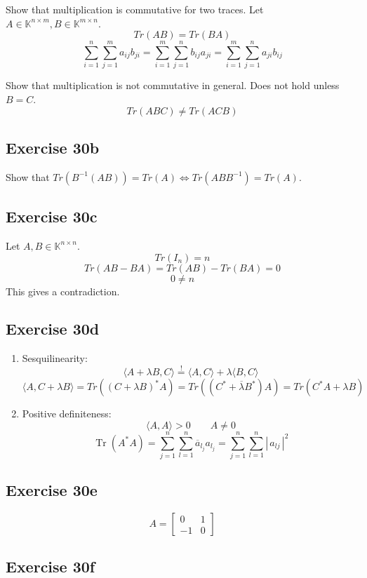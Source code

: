 \documentclass[a4paper]{article}
\theoremstyle{definition}
\DeclareMathOperator\Tr{Tr}
\newcommand\card[1]{\left|\,#1\,\right|}
\newcommand\angel[1]{\langle#1\rangle}
\begin{document}
Show that multiplication is commutative for two traces.
Let $A \in \mathbb K^{n\times m}, B \in \mathbb K^{m\times n}$.
\[ Tr(AB) = Tr(BA) \]
\[ \sum_{i=1}^n \sum_{j=1}^m a_{ij} b_{{ji}} = \sum_{i=1}^m \sum_{j=1}^n b_{ij} a_{ji} = \sum_{i=1}^m \sum_{j=1}^n a_{ji} b_{ij} \]

Show that multiplication is not commutative in general. Does not hold unless $B = C$.
\[ Tr(ABC) \neq Tr(ACB) \]

\subsection{Exercise 30b}

Show that $Tr(B^{-1}(AB)) = Tr(A) \iff Tr(ABB^{-1}) = Tr(A)$.

\subsection{Exercise 30c}

Let $A, B \in \mathbb K^{n\times n}$.
\[ Tr(I_n) = n \]
\[ Tr(AB - BA) = Tr(AB) - Tr(BA) = 0 \]
\[ 0 \neq n \]
This gives a contradiction.

\subsection{Exercise 30d}

\begin{enumerate}
  \item Sesquilinearity:
    \[ \langle A+\lambda B, C\rangle \overset!= \angel{A,C} + \lambda \angel{B,C} \]
    \[ \angel{A, C+\lambda B} = Tr((C + \lambda B)^* A) = Tr((C^* + \overline{\lambda} B^*) A) = Tr(C^* A + \lambda B) \]
  \item Positive definiteness:
    \[ \angel{A,A} > 0 \qquad A \neq 0 \]
    \[ \Tr(A^*A) = \sum_{j=1}^n \sum_{l=1}^n \overline{a}_{l_j} a_{l_j} = \sum_{j=1}^{n} \sum_{l=1}^{n} \card{a_{lj}}^2 \]
\end{enumerate}

\subsection{Exercise 30e}

\[ A = \begin{bmatrix} 0 & 1 \\ -1 & 0 \end{bmatrix} \]

\subsection{Exercise 30f}
\end{document}

